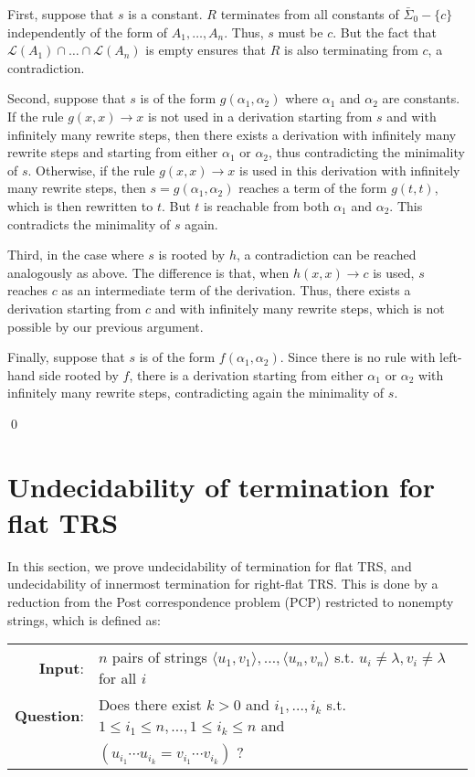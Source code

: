 \documentclass{LMCS}
\theoremstyle{plain}
\begin{document}
{\begin{enumerate}[$\bullet$]
First, suppose that $s$ is a constant. $R$ terminates from
all constants of $\bar{\Sigma}_0-\{c\}$ independently of
the form of $A_1,\ldots,A_n$. Thus, $s$ must be $c$.
But the fact that ${\mathcal L}(A_1)\cap\ldots\cap{\mathcal L}(A_n)$
is empty ensures that $R$ is also terminating from $c$, a
contradiction.

Second, suppose that $s$ is
of the form $g(\alpha_1,\alpha_2)$ where $\alpha_1$ and $\alpha_2$
are constants. If the
rule $g(x,x)\to x$ is not used
in a derivation starting from $s$ and with infinitely many
rewrite steps, then there exists a
derivation with infinitely many rewrite steps
and starting from either $\alpha_1$ or $\alpha_2$, thus contradicting
the minimality of $s$. Otherwise, if the rule $g(x,x)\to x$ is used
in this derivation with infinitely many rewrite steps,
then $s=g(\alpha_1,\alpha_2)$ reaches a term of the form
$g(t,t)$, which is then rewritten to $t$. But $t$ is reachable
from both $\alpha_1$ and $\alpha_2$. This contradicts the minimality
of $s$ again. 

Third, in the case where $s$ is rooted by $h$, a contradiction can
be reached analogously as above. The difference is that,
when $h(x,x)\to c$ is used, $s$ reaches $c$ as an intermediate
term of the derivation. Thus, there exists a
derivation starting from $c$ and with infinitely many rewrite steps,
which is not possible by our
previous argument.

Finally, suppose that $s$ is of the form $f(\alpha_1,\alpha_2)$.
Since there is no rule with left-hand side rooted by $f$,
there is a derivation starting from either
$\alpha_1$ or $\alpha_2$ with infinitely many rewrite steps,
contradicting again the minimality of $s$.
\end{enumerate}\qed
\endignore}

\section{Undecidability of termination for flat TRS}\label{sec-undec}

\noindent In this section, we prove undecidability of termination for 
flat TRS, and undecidability of innermost termination for 
right-flat TRS. This is done by
a reduction from the Post correspondence problem (PCP)
restricted to nonempty strings, which is defined as:\\
\begin{tabular}{rl}
{\bf Input}: & $n$ pairs of strings 
 $\langle u_1,v_1\rangle,\ldots,\langle u_n,v_n\rangle$ s.t. 
 $u_i\not=\lambda,v_i\not=\lambda$ for all $i$
\\
{\bf Question}:  &
Does there exist $k >0$ and $i_1,\ldots,i_k$ s.t.
$1\leq i_1\leq n,\ldots,1\leq i_k \leq n$ and
\\ &
$(u_{i_1}\cdots u_{i_k}=v_{i_1}\cdots v_{i_k})$ ?
\end{tabular}
\end{document}
